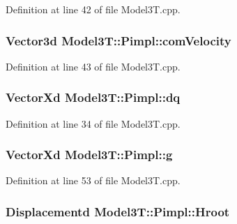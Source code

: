 Definition at line 42 of file Model3\+T.\+cpp.

\subsubsection[{\texorpdfstring{com\+Velocity}{comVelocity}}]{\setlength{\rightskip}{0pt plus 5cm}Vector3d Model3\+T\+::\+Pimpl\+::com\+Velocity}\hypertarget{structModel3T_1_1Pimpl_a80c7336da4224ba5105c067870e818bb}{}\label{structModel3T_1_1Pimpl_a80c7336da4224ba5105c067870e818bb}


Definition at line 43 of file Model3\+T.\+cpp.

\subsubsection[{\texorpdfstring{dq}{dq}}]{\setlength{\rightskip}{0pt plus 5cm}Vector\+Xd Model3\+T\+::\+Pimpl\+::dq}\hypertarget{structModel3T_1_1Pimpl_a38a7e4a5908517ee2bd63c75eb570f63}{}\label{structModel3T_1_1Pimpl_a38a7e4a5908517ee2bd63c75eb570f63}


Definition at line 34 of file Model3\+T.\+cpp.

\subsubsection[{\texorpdfstring{g}{g}}]{\setlength{\rightskip}{0pt plus 5cm}Vector\+Xd Model3\+T\+::\+Pimpl\+::g}\hypertarget{structModel3T_1_1Pimpl_a8a6bd5458703a775e213e47794a59d7d}{}\label{structModel3T_1_1Pimpl_a8a6bd5458703a775e213e47794a59d7d}


Definition at line 53 of file Model3\+T.\+cpp.

\subsubsection[{\texorpdfstring{Hroot}{Hroot}}]{\setlength{\rightskip}{0pt plus 5cm}Displacementd Model3\+T\+::\+Pimpl\+::\+Hroot}\hypertarget{structModel3T_1_1Pimpl_a02c47a2c2920e1ddfce6457502061f0b}{}\label{structModel3T_1_1Pimpl_a02c47a2c2920e1ddfce6457502061f0b}


